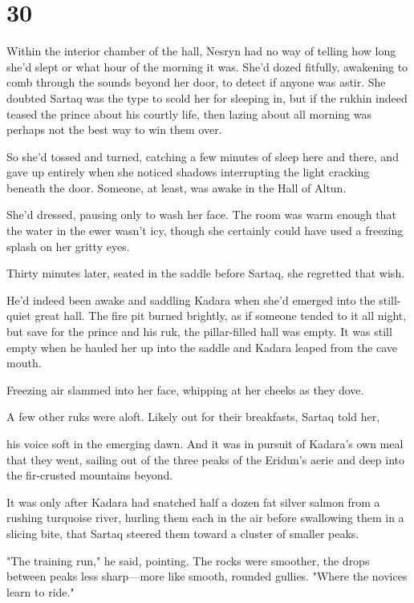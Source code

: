 
\chapter{30}

Within the interior chamber of the hall, Nesryn had no way of telling how long she'd slept or what hour of the morning it was. She'd dozed fitfully, awakening to comb through the sounds beyond her door, to detect if anyone was astir. She doubted Sartaq was the type to scold her for sleeping in, but if the rukhin indeed teased the prince about his courtly life, then lazing about all morning was perhaps not the best way to win them over.

So she'd tossed and turned, catching a few minutes of sleep here and there, and gave up entirely when she noticed shadows interrupting the light cracking beneath the door. Someone, at least, was awake in the Hall of Altun.

She'd dressed, pausing only to wash her face. The room was warm enough that the water in the ewer wasn't icy, though she certainly could have used a freezing splash on her gritty eyes.

Thirty minutes later, seated in the saddle before Sartaq, she regretted that wish.

He'd indeed been awake and saddling Kadara when she'd emerged into the still-quiet great hall. The fire pit burned brightly, as if someone tended to it all night, but save for the prince and his ruk, the pillar-filled hall was empty. It was still empty when he hauled her up into the saddle and Kadara leaped from the cave mouth.

Freezing air slammed into her face, whipping at her cheeks as they dove.

A few other ruks were aloft. Likely out for their breakfasts, Sartaq told her,

his voice soft in the emerging dawn. And it was in pursuit of Kadara's own meal that they went, sailing out of the three peaks of the Eridun's aerie and deep into the fir-crusted mountains beyond.

It was only after Kadara had snatched half a dozen fat silver salmon from a rushing turquoise river, hurling them each in the air before swallowing them in a slicing bite, that Sartaq steered them toward a cluster of smaller peaks.

"The training run," he said, pointing. The rocks were smoother, the drops between peaks less sharp---more like smooth, rounded gullies. "Where the novices learn to ride."

